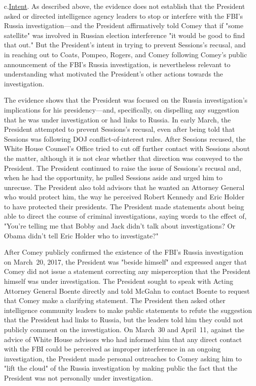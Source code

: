 c.\qquad\underline{Intent}.
As described above, the evidence does not establish that the President asked or directed intelligence agency leaders to stop or interfere with the FBI's Russia investigation---and the President affirmatively told Comey that if "some satellite" was involved in Russian election interference "it would be good to find that out."
But the President's intent in trying to prevent Sessions's recusal, and in reaching out to Coats, Pompeo, Rogers, and Comey following Comey's public announcement of the FBI's Russia investigation, is nevertheless relevant to understanding what motivated the President's other actions towards the investigation.

The evidence shows that the President was focused on the Russia investigation's implications for his presidency---and, specifically, on dispelling any suggestion that he was under investigation or had links to Russia.
In early March, the President attempted to prevent Sessions's recusal, even after being told that Sessions was following DOJ conflict-of-interest rules.
After Sessions recused, the White House Counsel's Office tried to cut off further contact with Sessions about the matter, although it is not clear whether that direction was conveyed to the President.
The President continued to raise the issue of Sessions's recusal and, when he had the opportunity, he pulled Sessions aside and urged him to unrecuse.
The President also told advisors that he wanted an Attorney General who would protect him, the way he perceived Robert Kennedy and Eric Holder to have protected their presidents.
The President made statements about being able to direct the course of criminal investigations, saying words to the effect of, "You're telling me that Bobby and Jack didn't talk about investigations?
Or Obama didn't tell Eric Holder who to investigate?"

After Comey publicly confirmed the existence of the FBI's Russia investigation on March~20, 2017, the President was "beside himself" and expressed anger that Comey did not issue a statement correcting any misperception that the President himself was under investigation.
The President sought to speak with Acting Attorney General Boente directly and told McGahn to contact Boente to request that Comey make a clarifying statement.
The President then asked other intelligence community leaders to make public statements to refute the suggestion that the President had links to Russia, but the leaders told him they could not publicly comment on the investigation.
On March~30 and April~11, against the advice of White House advisors who had informed him that any direct contact with the FBI could be perceived as improper interference in an ongoing investigation, the President made personal outreaches to Comey asking him to "lift the cloud" of the Russia investigation by making public the fact that the President was not personally under investigation.

